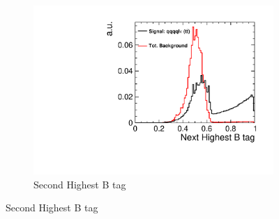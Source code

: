 \begin{figure}[]\ContinuedFloat 
  \begin{subfigure}[b]{0.5\linewidth}
    \centering
    \includegraphics[width=0.75\linewidth]{TopAnalysis/figures/BDTVariables/NextHighestBTag.pdf} 
    \caption{Second Highest B tag} 
    \vspace{4ex}
  \end{subfigure} 
\end{figure}

